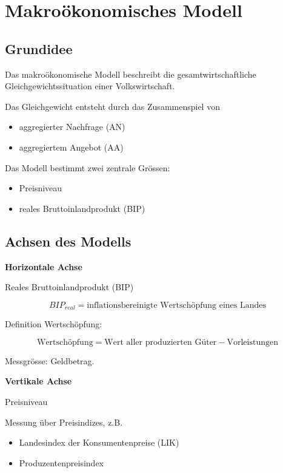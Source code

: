 \section{Makroökonomisches Modell}

\subsection{Grundidee}

Das makroökonomische Modell beschreibt die gesamtwirtschaftliche
Gleichgewichtssituation einer Volkswirtschaft.

Das Gleichgewicht entsteht durch das Zusammenspiel von

\begin{itemize}
    \item aggregierter Nachfrage (AN)
    \item aggregiertem Angebot (AA)
\end{itemize}

Das Modell bestimmt zwei zentrale Grössen:

\begin{itemize}
    \item Preisniveau
    \item reales Bruttoinlandprodukt (BIP)
\end{itemize}


\subsection{Achsen des Modells}

\textbf{Horizontale Achse}

Reales Bruttoinlandprodukt (BIP)

\[
    BIP_{real} = \text{inflationsbereinigte Wertschöpfung eines Landes}
\]

Definition Wertschöpfung:

\[
    \text{Wertschöpfung} =
    \text{Wert aller produzierten Güter}
    -
    \text{Vorleistungen}
\]

Messgrösse: Geldbetrag.

\textbf{Vertikale Achse}

Preisniveau

Messung über Preisindizes, z.B.

\begin{itemize}
\item Landesindex der Konsumentenpreise (LIK)
\item Produzentenpreisindex
\end{itemize}

